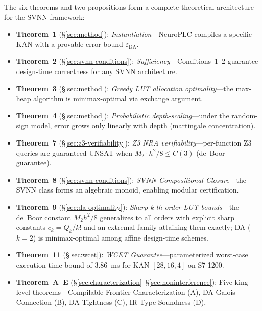 \vspace{4pt}
\begin{remark}
\label{rem:six_theorems}
The six theorems and two propositions form a complete theoretical
architecture for the SVNN framework:
\begin{itemize}
    \item \textbf{Theorem~1} ({\S}\ref{sec:method}): \textit{Instantiation}---NeuroPLC
          compiles a specific KAN with a provable error bound $\varepsilon_{\text{DA}}$.
    \item \textbf{Theorem~2} ({\S}\ref{sec:svnn-conditions}):
          \textit{Sufficiency}---Conditions~1--2 guarantee design-time
          correctness for any SVNN architecture.
    \item \textbf{Theorem~3} ({\S}\ref{sec:method}):
          \textit{Greedy LUT allocation optimality}---the max-heap algorithm is
          minimax-optimal via exchange argument.
    \item \textbf{Theorem~4} ({\S}\ref{sec:method}):
          \textit{Probabilistic depth-scaling}---under the random-sign model,
          error grows only linearly with depth (martingale concentration).
    \item \textbf{Theorem~7} ({\S}\ref{sec:z3-verifiability}):
          \textit{Z3 NRA verifiability}---per-function Z3 queries are guaranteed
          UNSAT when $M_2 \cdot h^2 / 8 \leq C(3)$ (de~Boor guarantee).
    \item \textbf{Theorem~8} ({\S}\ref{sec:svnn-conditions}):
          \textit{SVNN Compositional Closure}---the SVNN class forms an algebraic
          monoid, enabling modular certification.
    \item \textbf{Theorem~9} ({\S}\ref{sec:da-optimality}):
          \textit{Sharp k-th order LUT bounds}---the de~Boor constant
          $M_2h^2/8$ generalizes to all orders with explicit sharp
          constants $c_k = Q_k/k!$ and an extremal family attaining them
          exactly; DA ($k=2$) is minimax-optimal among affine design-time
          schemes.
    \item \textbf{Theorem~11} ({\S}\ref{sec:wcet}):
          \textit{WCET Guarantee}---parameterized worst-case execution time bound
          of $3.86$~ms for KAN $[28,16,4]$ on S7-1200.
    \item \textbf{Theorem~A--E} ({\S}\ref{sec:characterization}--{\S}\ref{sec:noninterference}):
          Five king-level theorems---Compilable Frontier Characterization (A),
          DA Galois Connection (B), DA Tightness (C), IR Type Soundness (D),

\end{itemize}
\end{remark}
